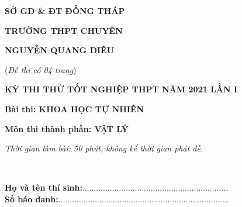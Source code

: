 \documentclass[11pt,a4paper]{book}
\begin{document}
	\begin{minipage}[b]{0.355\textwidth}
		\centerline{\textbf{\fontsize{12}{0}\selectfont SỞ GD \& ĐT ĐỒNG THÁP}}
		\centerline{\textbf{TRƯỜNG THPT CHUYÊN}}
			\centerline{\textbf{ NGUYỄN QUANG DIÊU}}
		
		\centerline{(\textit{Đề thi có 04 trang})}
	\end{minipage}
	\begin{minipage}[b]{0.7\textwidth}
		\centerline{\textbf{\fontsize{12}{0}\selectfont KỲ THI THỬ TỐT NGHIỆP THPT NĂM 2021 LẦN I}}
		\centerline{\textbf{Bài thi: KHOA HỌC TỰ NHIÊN }}
		\centerline{\textbf{Môn thi thành phần: VẬT LÝ}}
		\centerline{\textit{\fontsize{12}{0}\selectfont Thời gian làm bài: 50 phút, không kể thời gian phát đề.}}
	\end{minipage}\\[0.1cm]

\textbf{Họ và tên thí sinh:}................................................................\\ \textbf{Số báo danh:}...........................................................................
\end{document}
